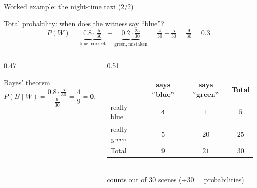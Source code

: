\documentclass[aspectratio=169,11pt]{beamer}
\begin{document}
\begin{frame}{Worked example: the night-time taxi (2/2)}
  \begin{block}{Total probability: when does the witness say ``blue''?}
    \[
      P(W)=\underbrace{0.8\cdot\tfrac{5}{30}}_{\text{blue, correct}}
      +\underbrace{0.2\cdot\tfrac{25}{30}}_{\text{green, mistaken}}
      =\tfrac{4}{30}+\tfrac{5}{30}=\tfrac{9}{30}=0.3
    \]
  \end{block}
  \begin{columns}[c]
    \begin{column}{0.47\textwidth}
      \begin{block}{Bayes' theorem}
        \[
          P(B\mid W)=\frac{0.8\cdot\frac{5}{30}}{\frac{9}{30}}
          =\frac{4}{9}=\textbf{0.444}
        \]
      \end{block}
    \end{column}
    \begin{column}{0.51\textwidth}
      \centering\small
      \renewcommand{\arraystretch}{1.25}
      \begin{tabular}{@{}l|cc|c@{}}
        \toprule
        & says ``blue'' & says ``green'' & Total\\
        \midrule
        really blue & $\mathbf{4}$ & $1$ & $5$\\
        really green & $5$ & $20$ & $25$\\
        \midrule
        Total & $\mathbf{9}$ & $21$ & $30$\\
        \bottomrule
      \end{tabular}\\[1pt]
      {\footnotesize counts out of $30$ scenes ($\div30$ = probabilities)}
    \end{column}
  \end{columns}
  \medskip
\end{frame}
\end{document}
